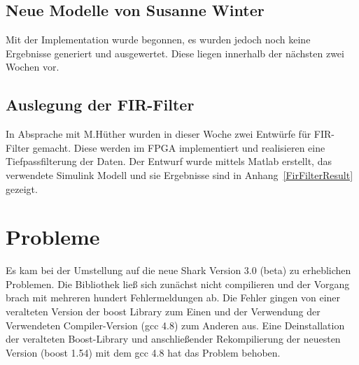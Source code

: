 \documentclass[a4paper,12pt,fleqn]{article}
\begin{document}
%
\subsection{Neue Modelle von Susanne Winter}
%
Mit der Implementation wurde begonnen, es wurden jedoch noch keine Ergebnisse generiert und ausgewertet. Diese liegen innerhalb der nächsten zwei Wochen vor.
%
\subsection{Auslegung der FIR-Filter}
%
In Absprache mit M.Hüther wurden in dieser Woche zwei Entwürfe für FIR-Filter gemacht. Diese werden im FPGA implementiert und realisieren eine Tiefpassfilterung der Daten. Der Entwurf wurde mittels Matlab erstellt, das verwendete Simulink Modell und sie Ergebnisse sind in Anhang~\ref{FirFilterResult} gezeigt.

%
\section{Probleme}
\label{Problems}
%
Es kam bei der Umstellung auf die neue Shark Version 3.0 (beta) zu erheblichen Problemen. Die Bibliothek ließ sich zunächst nicht compilieren und der Vorgang brach mit mehreren hundert Fehlermeldungen ab. Die Fehler gingen von einer veralteten Version der boost Library zum Einen und der Verwendung der Verwendeten Compiler-Version (gcc 4.8) zum Anderen aus. Eine Deinstallation der veralteten Boost-Library und anschließender Rekompilierung der neuesten Version (boost 1.54) mit dem gcc 4.8 hat das Problem behoben.
%


\newpage


\end{document}
